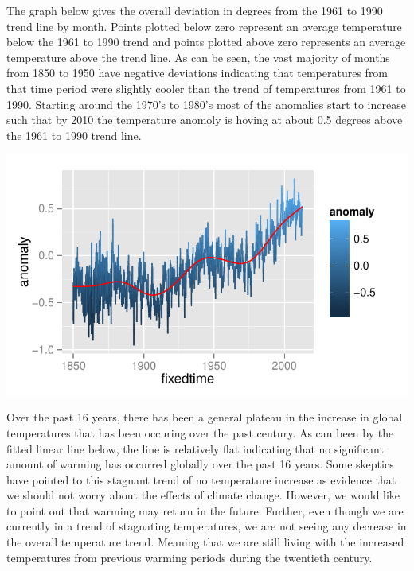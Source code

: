 \documentclass{article}\usepackage{graphicx, color}
\newenvironment{knitrout}{}{} %
\begin{document}
The graph below gives the overall deviation in degrees from the 1961 to 1990 trend line by month. Points plotted below zero represent an average temperature below the 1961 to 1990 trend and points plotted above zero represents an average temperature above the trend line. As can be seen, the vast majority of months from 1850 to 1950 have negative deviations indicating that temperatures from that time period were slightly cooler than the trend of temperatures from 1961 to 1990. Starting around the 1970's to 1980's most of the anomalies start to increase such that by 2010 the temperature anomoly is hoving at about 0.5 degrees above the 1961 to 1990 trend line.

\begin{knitrout}
\color{fgcolor}\includegraphics[width=\linewidth]{figure/plot-trend} 
\end{knitrout}


Over the past 16 years, there has been a general plateau in the increase in global temperatures that has been occuring over the past century. As can been by the fitted linear line below, the line is relatively flat indicating that no significant amount of warming has occurred globally over the past 16 years. Some skeptics have pointed to this stagnant trend of no temperature increase as evidence that we should not worry about the effects of climate change. However, we would like to point out that warming may return in the future. Further, even though we are currently in a trend of stagnating temperatures, we are not seeing any decrease in the overall temperature trend. Meaning that we are still living with the increased temperatures from previous warming periods during the twentieth century.
\end{document}
